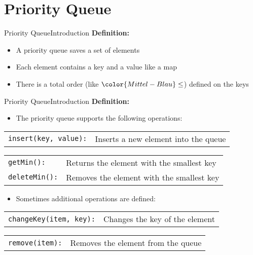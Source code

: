 
\section{Priority Queue}


\begin{frame}{Priority Queue}{Introduction}
  \textbf{Definition:}
  \begin{itemize}
    \item<2->
      A priority queue saves a set of elements
    \item<3->
      Each element contains a key and a value like a map
    \item<4->
      There is a total order (like ${\color{Mittel-Blau}\leq}$) defined on the
      keys
  \end{itemize}
\end{frame}


\begin{frame}{Priority Queue}{Introduction}
  \textbf{Definition:}
  \begin{itemize}
    \item<2->
      The priority queue supports the following operations:
  \end{itemize}
  \begin{tabular}{ll}
    {\color{Mittel-Blau}\texttt{insert(key, value):}} &
    Inserts a new element into the queue
  \end{tabular}
  \begin{tabular}{ll}
    {\color{Mittel-Blau}\texttt{getMin():}} &
    Returns the element with the smallest key\\
    {\color{Mittel-Blau}\texttt{deleteMin():}} &
    Removes the element with the smallest key
  \end{tabular}
  \vspace{1.0em}
  \begin{itemize}
    \item<5->
      Sometimes additional operations are defined:
  \end{itemize}
  \begin{tabular}{ll}
    {\color{Mittel-Blau}\texttt{changeKey(item, key):}} &
    Changes the key of the element
  \end{tabular}
  \begin{tabular}{ll}
    {\color{Mittel-Blau}\texttt{remove(item):}} &
    Removes the element from the queue
  \end{tabular}
\end{frame}

